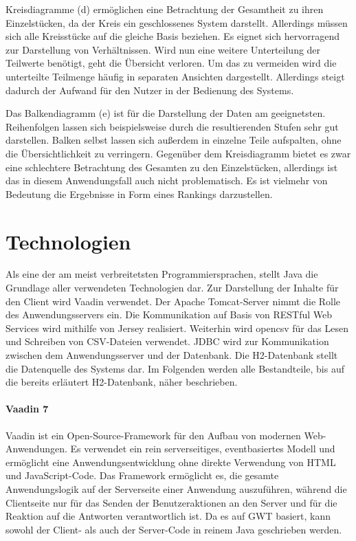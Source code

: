 Kreisdiagramme (d) ermöglichen eine Betrachtung der Gesamtheit zu ihren Einzelstücken, da der Kreis ein geschlossenes System darstellt. Allerdings müssen sich alle Kreisstücke auf die gleiche Basis beziehen. Es eignet sich hervorragend zur Darstellung von Verhältnissen. Wird nun eine weitere Unterteilung der Teilwerte benötigt, geht die Übersicht verloren. Um das zu vermeiden wird die unterteilte Teilmenge häufig in separaten Ansichten dargestellt. Allerdings steigt dadurch der Aufwand für den Nutzer in der Bedienung des Systems. 

Das Balkendiagramm (e) ist für die Darstellung der Daten am geeignetsten. Reihenfolgen lassen sich beispielsweise durch die resultierenden Stufen sehr gut darstellen. Balken selbst lassen sich außerdem in einzelne Teile aufspalten, ohne die Übersichtlichkeit zu verringern. Gegenüber dem Kreisdiagramm bietet es zwar eine schlechtere Betrachtung des Gesamten zu den Einzelstücken, allerdings ist das in diesem Anwendungsfall auch nicht problematisch. Es ist vielmehr von Bedeutung die Ergebnisse in Form eines Rankings darzustellen.

\section{Technologien}

Als eine der am meist verbreitetsten Programmiersprachen, stellt Java die Grundlage aller verwendeten Technologien dar. Zur Darstellung der Inhalte für den Client wird Vaadin verwendet. Der Apache Tomcat-Server nimmt die Rolle des Anwendungsservers ein. Die Kommunikation auf Basis von RESTful Web Services wird mithilfe von Jersey realisiert. Weiterhin wird opencsv für das Lesen und Schreiben von CSV-Dateien verwendet. JDBC wird zur Kommunikation zwischen dem Anwendungsserver und der Datenbank. Die H2-Datenbank stellt die Datenquelle des Systems dar. Im Folgenden werden alle Bestandteile, bis auf die bereits erläutert H2-Datenbank, näher beschrieben. 

\paragraph{Vaadin 7}

Vaadin ist ein Open-Source-Framework für den Aufbau von modernen Web-Anwendungen. Es verwendet ein rein serverseitiges, eventbasiertes Modell und ermöglicht eine Anwendungsentwicklung ohne direkte Verwendung von HTML und JavaScript-Code. Das Framework ermöglicht es, die gesamte Anwendungslogik auf der Serverseite einer Anwendung auszuführen, während die Clientseite nur für das Senden der Benutzeraktionen an den Server und für die Reaktion auf die Antworten verantwortlich ist. Da es auf GWT basiert, kann sowohl der Client- als auch der Server-Code in reinem Java geschrieben werden.

